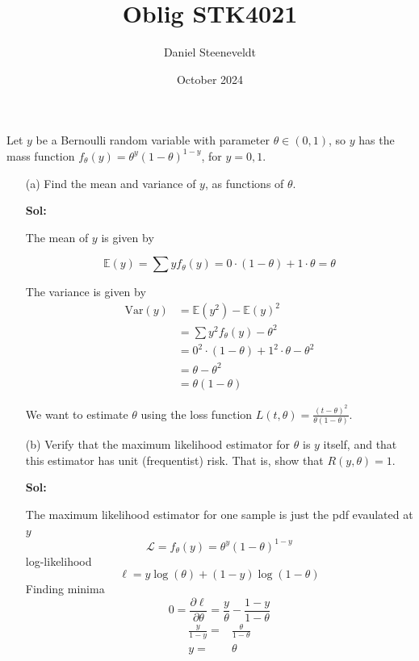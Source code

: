 \documentclass{article}
\title{Oblig STK4021}
\author{Daniel Steeneveldt}
\date{October 2024}
\begin{document}
\maketitle
\section{}
Let $y$ be a Bernoulli random variable with parameter $\theta \in (0,1)$, so $y$ has the mass function $f_\theta(y) = \theta^y(1-\theta)^{1-y}$, for $y = 0,1$.
\begin{enumerate}

    \item[(a)] Find the mean and variance of $y$, as functions of $\theta$.
    


    \textbf{Sol:}
    \par
    The mean of $y$ is given by

    \[
    \mathbb{E}(y) = \sum y f_{\theta} (y) = 0 \cdot (1-\theta) + 1 \cdot \theta = \theta
    \]

    The variance is given by
    \begin{align*}
    \text{Var}(y) &= \mathbb{E}(y^2) - \mathbb{E}(y)^2 \\
    &= \sum y^2 f_{\theta} (y) - \theta^2 \\
    &= 0^2 \cdot (1-\theta) + 1^2 \cdot \theta - \theta^2 \\
    &= \theta - \theta^2 \\
    &= \theta(1- \theta)
    \end{align*}



    We want to estimate $\theta$ using the loss function $L(t, \theta) = \frac{(t-\theta)^2}{\theta(1-\theta)}$.
    
    \item[(b)] Verify that the maximum likelihood estimator for $\theta$ is $y$ itself, and that this estimator has unit (frequentist) risk. That is, show that $R(y, \theta) = 1$.

    \textbf{Sol:}
    \par
    The maximum likelihood estimator for one sample is just the pdf evaulated at $y$
    \[
    \mathcal{L} = f_{\theta}(y) = \theta^y (1-\theta)^{1-y}
    \]
    log-likelihood
    \[
    \ell = y \log(\theta) + (1-y) \log(1-\theta)
    \]
    Finding minima
    \[
        0 = \frac{\partial \ell}{\partial \theta} = \frac{y}{\theta} - \frac{1-y}{1-\theta} 
    \]
    \begin{align*}
        \frac{y}{1-y} =& \frac{\theta}{1-\theta}\\
        y =& \theta
    \end{align*}


\end{enumerate}
\end{document}
